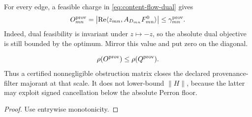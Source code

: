 For every edge, a feasible charge in
\cref{eq:content-flow-dual} gives
\[
 O^{\rm prov}_{mn}
 =
 \left|
 \operatorname{Re}\langle z_{mn},A_{D_{mn}}F^0_{mn}\rangle
 \right|
 \le
 \gamma^{\rm prov}_{mn}.
\]
Indeed, dual feasibility is invariant under \(z\mapsto-z\), so the
absolute dual objective is still bounded by the optimum.  Mirror this
value and put zero on the diagonal.

\begin{corollary}
\label{cor:provenance-Perron-obstruction}
\[
\rho(O^{\rm prov})
\le
\rho(Q^{\rm prov}).
\]
Thus a certified nonnegligible obstruction matrix closes the declared
provenance-filter majorant at that scale.  It does not lower-bound
\(\|H\|\), because the latter may exploit signed cancellation below the
absolute Perron floor.
\end{corollary}

\begin{proof}
Use entrywise monotonicity.
\end{proof}

